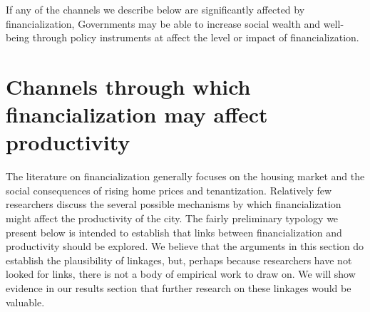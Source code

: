 If any of the channels we describe below are significantly affected by financialization, Governments may be able to increase social wealth and well-being through policy instruments at affect the level or impact of financialization. 










\section{Channels through which financialization may affect productivity}
The literature on financialization generally focuses on the housing market and the social consequences of rising home prices and tenantization.  Relatively few researchers discuss the several possible mechanisms by which financialization might affect the productivity of the city. The fairly preliminary typology we present below is intended to establish that links between financialization and productivity should be explored. We believe that the arguments in this section do establish the plausibility of linkages, but, perhaps because researchers have not looked for links, there is not a body of empirical work to draw on. We will show evidence in our results section that further research on these linkages would be valuable.

